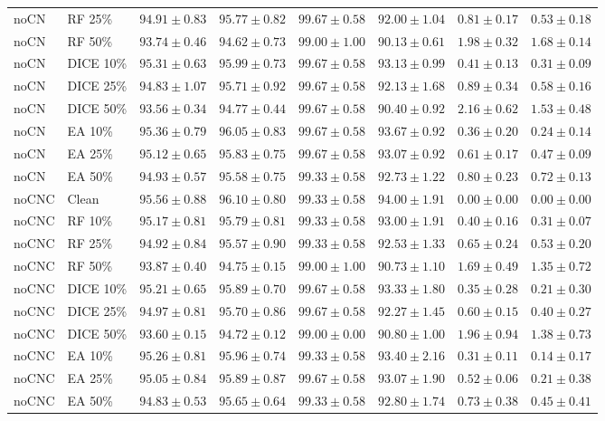 {\begin{longtable}{llrrrrrr}
noCN & RF 25\% & $94.91\pm0.83$ & $95.77\pm0.82$ & $99.67\pm0.58$ & $92.00\pm1.04$ & $0.81\pm0.17$ & $0.53\pm0.18$ \\
noCN & RF 50\% & $93.74\pm0.46$ & $94.62\pm0.73$ & $99.00\pm1.00$ & $90.13\pm0.61$ & $1.98\pm0.32$ & $1.68\pm0.14$ \\
noCN & DICE 10\% & $95.31\pm0.63$ & $95.99\pm0.73$ & $99.67\pm0.58$ & $93.13\pm0.99$ & $0.41\pm0.13$ & $0.31\pm0.09$ \\
noCN & DICE 25\% & $94.83\pm1.07$ & $95.71\pm0.92$ & $99.67\pm0.58$ & $92.13\pm1.68$ & $0.89\pm0.34$ & $0.58\pm0.16$ \\
noCN & DICE 50\% & $93.56\pm0.34$ & $94.77\pm0.44$ & $99.67\pm0.58$ & $90.40\pm0.92$ & $2.16\pm0.62$ & $1.53\pm0.48$ \\
noCN & EA 10\% & $95.36\pm0.79$ & $96.05\pm0.83$ & $99.67\pm0.58$ & $93.67\pm0.92$ & $0.36\pm0.20$ & $0.24\pm0.14$ \\
noCN & EA 25\% & $95.12\pm0.65$ & $95.83\pm0.75$ & $99.67\pm0.58$ & $93.07\pm0.92$ & $0.61\pm0.17$ & $0.47\pm0.09$ \\
noCN & EA 50\% & $94.93\pm0.57$ & $95.58\pm0.75$ & $99.33\pm0.58$ & $92.73\pm1.22$ & $0.80\pm0.23$ & $0.72\pm0.13$ \\
noCNC & Clean & $95.56\pm0.88$ & $96.10\pm0.80$ & $99.33\pm0.58$ & $94.00\pm1.91$ & $0.00\pm0.00$ & $0.00\pm0.00$ \\
noCNC & RF 10\% & $95.17\pm0.81$ & $95.79\pm0.81$ & $99.33\pm0.58$ & $93.00\pm1.91$ & $0.40\pm0.16$ & $0.31\pm0.07$ \\
noCNC & RF 25\% & $94.92\pm0.84$ & $95.57\pm0.90$ & $99.33\pm0.58$ & $92.53\pm1.33$ & $0.65\pm0.24$ & $0.53\pm0.20$ \\
noCNC & RF 50\% & $93.87\pm0.40$ & $94.75\pm0.15$ & $99.00\pm1.00$ & $90.73\pm1.10$ & $1.69\pm0.49$ & $1.35\pm0.72$ \\
noCNC & DICE 10\% & $95.21\pm0.65$ & $95.89\pm0.70$ & $99.67\pm0.58$ & $93.33\pm1.80$ & $0.35\pm0.28$ & $0.21\pm0.30$ \\
noCNC & DICE 25\% & $94.97\pm0.81$ & $95.70\pm0.86$ & $99.67\pm0.58$ & $92.27\pm1.45$ & $0.60\pm0.15$ & $0.40\pm0.27$ \\
noCNC & DICE 50\% & $93.60\pm0.15$ & $94.72\pm0.12$ & $99.00\pm0.00$ & $90.80\pm1.00$ & $1.96\pm0.94$ & $1.38\pm0.73$ \\
noCNC & EA 10\% & $95.26\pm0.81$ & $95.96\pm0.74$ & $99.33\pm0.58$ & $93.40\pm2.16$ & $0.31\pm0.11$ & $0.14\pm0.17$ \\
noCNC & EA 25\% & $95.05\pm0.84$ & $95.89\pm0.87$ & $99.67\pm0.58$ & $93.07\pm1.90$ & $0.52\pm0.06$ & $0.21\pm0.38$ \\
noCNC & EA 50\% & $94.83\pm0.53$ & $95.65\pm0.64$ & $99.33\pm0.58$ & $92.80\pm1.74$ & $0.73\pm0.38$ & $0.45\pm0.41$ \\
\end{longtable}
}

